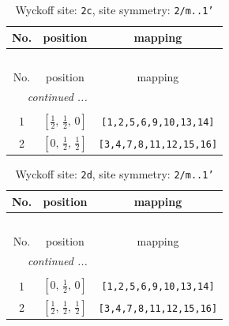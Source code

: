 \documentclass[fleqn,8pt]{jsarticle}
\begin{document}
\renewcommand{\arraystretch}{1.2}
\begin{longtable}{ccc}
\caption{Wyckoff site: {\tt 2c}, site symmetry: {\tt 2/m..1'}}
 \\
 \hline \hline
No. & position & mapping \\ \hline \endfirsthead

\multicolumn{2}{l}{\tablename\ \thetable{}} \\
 \hline \hline
No. & position & mapping \\ \hline \endhead

 \hline \hline
\multicolumn{2}{r}{\footnotesize\it continued ...} \\ \endfoot

 \hline \hline
\multicolumn{2}{r}{} \\ \endlastfoot

1 & $\left[ \frac{1}{2},\, \frac{1}{2},\, 0 \right]$ & {\tt [1,2,5,6,9,10,13,14]} \\ \hline
2 & $\left[ 0,\, \frac{1}{2},\, \frac{1}{2} \right]$ & {\tt [3,4,7,8,11,12,15,16]} \\
\end{longtable}
\renewcommand{\arraystretch}{1.2}
\begin{longtable}{ccc}
\caption{Wyckoff site: {\tt 2d}, site symmetry: {\tt 2/m..1'}}
 \\
 \hline \hline
No. & position & mapping \\ \hline \endfirsthead

\multicolumn{2}{l}{\tablename\ \thetable{}} \\
 \hline \hline
No. & position & mapping \\ \hline \endhead

 \hline \hline
\multicolumn{2}{r}{\footnotesize\it continued ...} \\ \endfoot

 \hline \hline
\multicolumn{2}{r}{} \\ \endlastfoot

1 & $\left[ 0,\, \frac{1}{2},\, 0 \right]$ & {\tt [1,2,5,6,9,10,13,14]} \\ \hline
2 & $\left[ \frac{1}{2},\, \frac{1}{2},\, \frac{1}{2} \right]$ & {\tt [3,4,7,8,11,12,15,16]} \\
\end{longtable}
\renewcommand{\arraystretch}{1.2}
\end{document}
